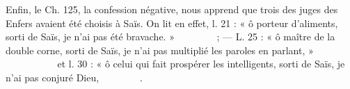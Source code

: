 \documentclass[a4paper, 11pt, oneside]{article}
\newcommand*\hieroAAAD{}
\newcommand*\hieroAAAG{}
\newcommand*\hieroAAAH{}
\newcommand*\hieroAAAW{\raisebox{0.5ex}{}}
\newcommand*\hieroAABC{\raisebox{0.5ex}{}}
\newcommand*\hieroAACJ{}
\newcommand*\hieroAACM{}
\newcommand*\hieroAACN{\raisebox{1ex}{}}
\newcommand*\hieroAADB{}
\newcommand*\hieroAADC{\raisebox{0.5ex}{}}
\newcommand*\hieroAADF{}
\newcommand*\hieroAADS{}
\newcommand*\hieroAADT{}
\newcommand*\hieroAADU{}
\newcommand*\hieroAADV{\raisebox{0.5ex}{}}
\newcommand*\hieroAADW{}
\newcommand*\hieroAADX{}
\newcommand*\hieroAADY{\raisebox{0.3ex}{}}
\newcommand*\hieroAADZ{}
\newcommand*\hieroAAEA{}
\newcommand*\hieroAAEB{}
\newcommand*\hieroAAEC{}
\newcommand*\hieroAAED{}
\newcommand*\hieroAAEE{}
\newcommand*\hieroAAEF{}
\newcommand*\hieroAAEG{}
\newcommand*\hieroAAEH{}
\newcommand*\hieroAAEI{}
\newcommand*\hieroAAEJ{}
\newcommand*\hieroAAEK{}
\begin{document}
Enfin, le Ch. 125, la confession négative, nous apprend que trois des juges des Enfers avaient été choisis à Saïs. On lit en effet, l. 21 : « ô porteur d'aliments, sorti de Saïs, je n'ai pas été bravache. » $\hieroAAAH\:\hieroAADF\:\hieroAACJ\:\hieroAACN\allowbreak\:\hieroAADS\:\hieroAADT\:\hieroAADU\:\hieroAADV\allowbreak\:\hieroAAAD\:\hieroAAAG\:\hieroAADC\:\hieroAAAW\allowbreak\:\hieroAADB\:\hieroAADW\:\hieroAADU\allowbreak\:\hieroAADX\:\hieroAADF$ ; --- L. 25 : « ô maître de la double corne, sorti de Saïs, je n'ai pas multiplié les paroles en parlant, » $\hieroAAAH\:\hieroAADF\:\hieroAABC\allowbreak\:\hieroAADY\:\hieroAADY\:\hieroAADU\allowbreak\:\hieroAADV\:\hieroAAAD\:\hieroAAAG\allowbreak\:\hieroAADC\:\hieroAAAW\:\hieroAADB\allowbreak\:\hieroAADW\:\hieroAADZ\:\hieroAAEA\allowbreak\:\hieroAACM\:\hieroAADF\:\hieroAAEB\allowbreak\:\hieroAAEC\:\hieroAAED\:\hieroAAEE\allowbreak\:\hieroAADF\:\hieroAAEF$ et l. 30 : « ô celui qui fait prospérer les intelligents, sorti de Saïs, je n'ai pas conjuré Dieu, $\hieroAAAH\:\hieroAADF\:\hieroAAEG\allowbreak\:\hieroAAEH\:\hieroAAEI\:\hieroAADU\allowbreak\:\hieroAADV\:\hieroAAAD\:\hieroAAAG\allowbreak\:\hieroAADC\:\hieroAAAW\:\hieroAADB\allowbreak\:\hieroAADW\:\hieroAAEJ\:\hieroAADF\allowbreak\:\hieroAAEB\:\hieroAAEK\:\hieroAADB$.
\end{document}
